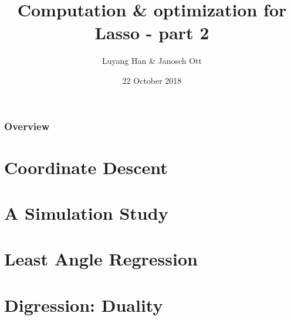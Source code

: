 \documentclass{beamer}
\title[Computation \& optimization]{Computation \& optimization for Lasso - part 2} %
\author{Luyang Han \& Janosch Ott} %
\institute[] %
{
ETH Zürich \\ %
}
\date{22 October 2018} %
\begin{document}
\begin{frame}
\titlepage %
\end{frame}

\begin{frame}
\frametitle{Overview} %
\tableofcontents %
\end{frame}


\section{Coordinate Descent}



\section{A Simulation Study}



\section{Least Angle Regression}




\section{Digression: Duality}
\end{document}
